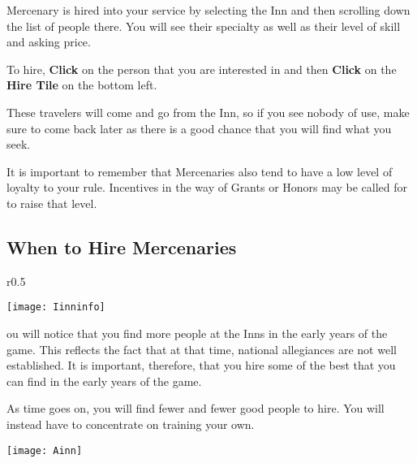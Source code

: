  Mercenary is hired into your service by selecting the Inn and then scrolling down the list of people there. You will see their specialty as well as their level of skill and asking price.

To hire, \textbf{Click} on the person that you are interested in and then \textbf{Click} on the \textbf{Hire Tile} on the bottom left.

These travelers will come and go from the Inn, so if you see nobody of use, make sure to come back later as there is a good chance that you will find what you seek.

It is important to remember that Mercenaries also tend to have a low level of loyalty to your rule. Incentives in the way of Grants or Honors may be called for to raise that level.

\subsection{When to Hire Mercenaries}

\begin{wrapfigure}{r}{0.5\textwidth}
	\vspace{-20pt}
	\begin{center}
		\texttt{[image: Iinninfo]} %
	\end{center}
	\vspace{-20pt}
\end{wrapfigure}

ou will notice that you find more people at the Inns in the early years of the game. This reflects the fact that at that time, national allegiances are not well established. It is important, therefore, that you hire some of the best that you can find in the early years of the game.

As time goes on, you will find fewer and fewer good people to hire. You will instead have to concentrate on training your own.

\vspace{1.5in}

\begin{center}
	\texttt{[image: Ainn]}
\end{center}